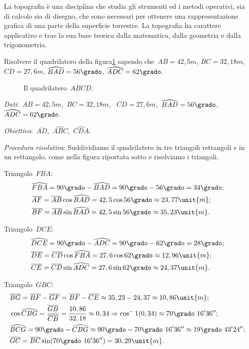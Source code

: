 La topografia è una disciplina che studia gli strumenti ed i metodi operativi, 
sia di calcolo sia di disegno, che sono necessari per ottenere
una rappresentazione grafica di una parte della superficie terrestre.
La topografia ha carattere applicativo e trae la sua base teorica dalla 
matematica, dalla geometria e dalla trigonometria.

 \begin{esempio}
Risolvere il quadrilatero della figura\ref{fig:G.7} sapendo 
che~$AB=42,5\unit{m}$, $BC=32,18\unit{m}$, $CD=27,6\unit{m}$,
$\widehat{BAD}=56\grado$, $\widehat{ADC}=62\grado$.
\begin{inaccessibleblock}
 \begin{figure}[t]
\centering

\caption{Il quadrilatero~$ABCD$.}\label{fig:G.7}
\end{figure}
\end{inaccessibleblock}

\emph{Dati}:~$\overline{AB}=42,5\unit{m}$,\quad~$\overline{BC}=32,18\unit{m}$,
\quad~$\overline{CD}=27,6\unit{m}$,\quad~$\widehat{BAD}=56\grado$,
\quad~$\widehat{ADC}=62\grado$.

\emph{Obiettivo}:~$\overline{AD}$,\quad~$\widehat{ABC}$,\quad~$\widehat{CDA}$.

\emph{Procedura risolutiva}:
Suddividiamo il quadrilatero in tre triangoli rettangoli e in un rettangolo, 
come nella figura riportata sotto e risolviamo i triangoli.

Triangolo~$FBA$:
\begin{align*}
&\widehat{FBA}=90\grado-\widehat{BAD}=90\grado-56\grado=34\grado;\\
&\overline{AF}=\overline{AB}\cos \widehat{BAD} = 42,5\cos 56\grado \approx23,
77\unit{m};\\
&\overline{BF}=\overline{AB}\sin \widehat{BAD} =42,5 \sin 56\grado\approx35,
23\unit{m}.
\end{align*}

Triangolo~$DCE$:
\begin{align*}
 &\widehat{DCE}=90\grado-\widehat{ADC}=90\grado-62\grado=28\grado;\\
&\overline{DE}=\overline{CD}\cos \widehat{FBA}=27,6\cos 62\grado \approx12,
96\unit{m};\\
&\overline{CE}=\overline{CD}\sin \widehat{ADC} =27,6 \sin 62\grado \approx24,
37\unit{m}.
\end{align*}

Triangolo~$GBC$:
\begin{align*}
&\overline{BG}=\overline{BF}-\overline{GF}=\overline{BF}-\overline{CE}\approx35,
23-24,37\approx10,86\unit{m};\\
&\cos \widehat{CBG}=\frac{\overline{GB}}{\overline{CB}}=\frac{10,86}{32,18}
\approx0,34\Rightarrow\cos^-1(0,34)\approx70\grado~16' 36'';\\
&\widehat{BCG}=90\grado-\widehat{CBG}\approx90\grado-70\grado~16' 
36''\approx19\grado~43' 24'';\\
&\overline{GC}=\overline{BC}\sin (70\grado~16' 36'')=30,29\unit{m}.
\end{align*}


\end{esempio}
